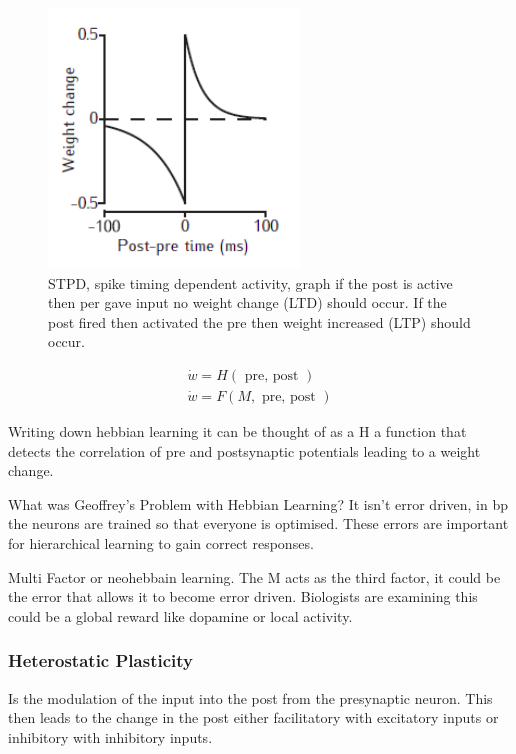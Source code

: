 \documentclass[main]{subfiles}
\begin{document}
\begin{figure}[H]
    \centering
    \includegraphics[width=.5\textwidth]{03_PlasticityInTheBrain/figures/pasted_image_6.png}
    \caption{STPD, spike timing dependent activity, graph if the post is active then per gave input no weight change (LTD) should occur. If the post fired then activated the pre then weight increased (LTP) should occur.}
    \label{fig:syn_plas1t}
\end{figure}

\begin{equation}
\begin{array}{l}
{\dot{w}=H(\text { pre, post })} \\
{\dot{w}=F(M, \text { pre, post })}
\end{array}
\end{equation}
    

Writing down hebbian learning it can be thought of as a H a function that detects the correlation of pre and postsynaptic potentials leading to a weight change. 

What was Geoffrey’s Problem with Hebbian Learning?
It isn’t error driven, in bp the neurons are trained so that everyone is optimised. These errors are important for hierarchical learning to gain correct responses. 

Multi Factor or neohebbain learning. 
The M acts as the third factor, it could be the error that allows it to become error driven. Biologists are examining this could be a global reward like dopamine or local activity. 


\subsubsection{Heterostatic Plasticity}
Is the modulation of the input into the post from the presynaptic neuron. This then leads to the change in the post either facilitatory with excitatory inputs or inhibitory with inhibitory inputs. 
\end{document}
